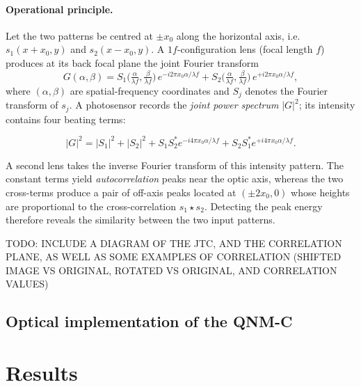 \documentclass[twocolumn]{article} %
\begin{document}
\paragraph{Operational principle.}
Let the two patterns be centred at \(\pm x_{0}\) along the horizontal
axis, i.e.\ \(s_{1}(x+x_{0},y)\) and \(s_{2}(x-x_{0},y)\).  A
\(1f\)-configuration lens (focal length \(f\)) produces at its back
focal plane the joint Fourier transform
\[
  G(\alpha,\beta)=
    S_{1}\!\bigl(\tfrac{\alpha}{\lambda f},
                 \tfrac{\beta}{\lambda f}\bigr)\,
      e^{-i2\pi x_{0}\alpha/\lambda f}
  + S_{2}\!\bigl(\tfrac{\alpha}{\lambda f},
                 \tfrac{\beta}{\lambda f}\bigr)\,
      e^{+i2\pi x_{0}\alpha/\lambda f},
\]
where \((\alpha,\beta)\) are spatial-frequency coordinates and
\(S_{j}\) denotes the Fourier transform of \(s_{j}\).
A photosensor records the \emph{joint power spectrum}
\(|G|^{2}\); its intensity contains four beating terms:

\[
  |G|^{2}
  =|S_{1}|^{2}+|S_{2}|^{2}
   +S_{1}S_{2}^{\!*}e^{-i4\pi x_{0}\alpha/\lambda f}
   +S_{2}S_{1}^{\!*}e^{+i4\pi x_{0}\alpha/\lambda f}.
\]

A second lens takes the inverse Fourier transform of this intensity
pattern.  The constant terms yield \emph{autocorrelation}
peaks near the optic axis, whereas the two cross-terms produce a pair
of off-axis peaks located at \((\pm2x_{0},0)\) whose heights are
proportional to the cross-correlation
\(s_{1}\star s_{2}\).  Detecting the peak energy therefore reveals the
similarity between the two input patterns.

TODO: INCLUDE A DIAGRAM OF THE JTC, AND THE CORRELATION PLANE, AS WELL AS SOME EXAMPLES OF CORRELATION (SHIFTED IMAGE VS ORIGINAL, ROTATED VS ORIGINAL, AND CORRELATION VALUES)

\subsection{Optical implementation of the QNM-C}


\section{Results}
\end{document}
